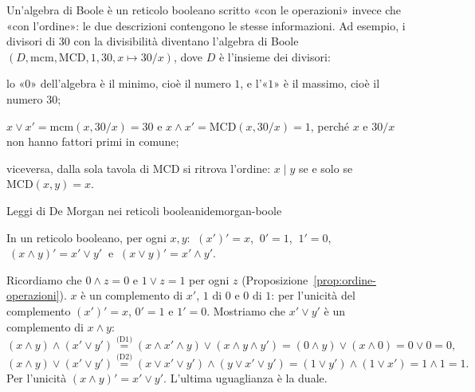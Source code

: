 \begin{spiegazione}
    Un'algebra di Boole è un reticolo booleano scritto «con le operazioni» invece che «con l'ordine»: le due descrizioni contengono le stesse
    informazioni. Ad esempio, i divisori di $30$ con la divisibilità diventano l'algebra di Boole $(D, \mathrm{mcm}, \mathrm{MCD}, 1, 30, x \mapsto 30/x)$, dove $D$ è
    l'insieme dei divisori:
    \begin{passi}
        \item lo «$0$» dell'algebra è il minimo, cioè il numero $1$, e l'«$1$» è il massimo, cioè il numero $30$;
        \item $x \vee x' = \mathrm{mcm}(x, 30/x) = 30$ e $x \wedge x' = \mathrm{MCD}(x, 30/x) = 1$, perché $x$ e $30/x$ non hanno fattori primi in comune;
        \item viceversa, dalla sola tavola di $\mathrm{MCD}$ si ritrova l'ordine: $x \mid y$ se e solo se $\mathrm{MCD}(x, y) = x$.
    \end{passi}
\end{spiegazione}

\begin{concetto}
\begin{Proposizione}{Leggi di De Morgan nei reticoli booleani}{demorgan-boole}
    \begin{prerequisiti}
    \end{prerequisiti}
    In un reticolo booleano, per ogni $x, y$: $\ (x')' = x$, $\ 0' = 1$, $\ 1' = 0$, $\ (x \wedge y)' = x' \vee y'\ $ e $\ (x \vee y)' = x' \wedge y'$.
\end{Proposizione}
\begin{dimostrazione}
    Ricordiamo che $0 \wedge z = 0$ e $1 \vee z = 1$ per ogni $z$ (Proposizione~\ref{prop:ordine-operazioni}). $x$ è un complemento di $x'$, $1$ di $0$ e $0$ di $1$: per l'unicità
    del complemento $(x')' = x$, $0' = 1$ e $1' = 0$. Mostriamo che $x' \vee y'$ è un complemento di $x \wedge y$:
    \[ (x \wedge y) \wedge (x' \vee y') \overset{\text{(D1)}}{=} (x \wedge x' \wedge y) \vee (x \wedge y \wedge y') = (0 \wedge y) \vee (x \wedge 0) = 0 \vee 0 = 0, \]
    \[ (x \wedge y) \vee (x' \vee y') \overset{\text{(D2)}}{=} (x \vee x' \vee y') \wedge (y \vee x' \vee y') = (1 \vee y') \wedge (1 \vee x') = 1 \wedge 1 = 1. \]
    Per l'unicità $(x \wedge y)' = x' \vee y'$. L'ultima uguaglianza è la duale.
\end{dimostrazione}
\end{concetto}

